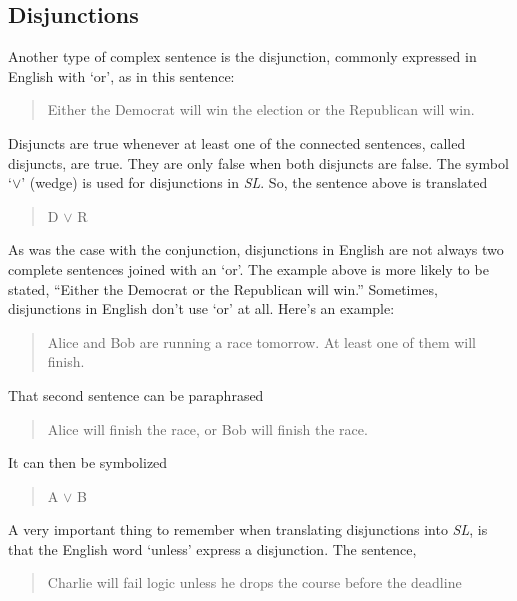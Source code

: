 \documentclass[../logic-text.tex]{subfiles}
\begin{document}
\subsection{Disjunctions}
\label{sec:disjunctions}

Another type of complex sentence is the disjunction, commonly expressed in English with \enquote*{or}, as in this sentence:

\begin{quote}
  Either the Democrat will win the election or the Republican will win.
\end{quote}

Disjuncts are true whenever at least one of the connected sentences, called disjuncts, are true. They are only false when both disjuncts are false. The  symbol \enquote*{\(\lor\)} (wedge) is used for disjunctions in \emph{SL}. So, the sentence above is translated

\begin{quote}
  D \(\lor\) R
\end{quote}


As was the case with the conjunction, disjunctions in English are not always two complete sentences joined with an \enquote*{or}.
The example above is more likely to be stated, \enquote{Either the Democrat or the Republican will win.}
Sometimes, disjunctions in English don't use \enquote*{or} at all. Here's an example:

\begin{quote}
  Alice and Bob are running a race tomorrow. At least one of them will finish.
\end{quote}

\noindent That second sentence can be paraphrased

\begin{quote}
  Alice will finish the race, or Bob will finish the race.
\end{quote}


\noindent It can then be symbolized

\begin{quote}
  A \(\lor\) B
\end{quote}

A very important thing to remember when translating disjunctions into \emph{SL}, is that the English word \enquote*{unless} express a disjunction. The sentence,

\begin{quote}
  Charlie will fail logic unless he drops the course before the deadline 
\end{quote}
\end{document}
